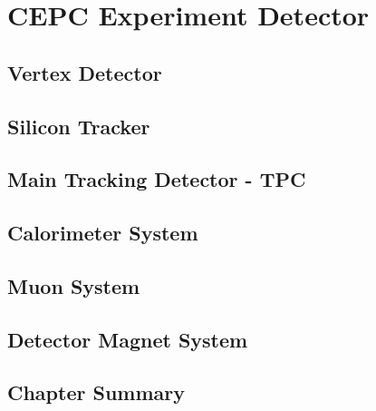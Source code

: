 
\chapter{CEPC Experiment Detector}
\label{chap:2}

\section{Vertex Detector}

\section{Silicon Tracker}

\section{Main Tracking Detector - TPC}

\section{Calorimeter System}

\section{Muon System}

\section{Detector Magnet System}

\section{Chapter Summary}
